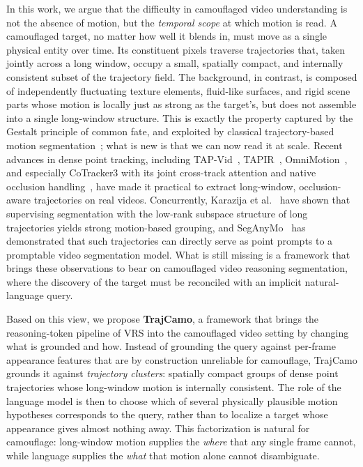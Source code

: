 \documentclass[11pt]{article}
\begin{document}
In this work, we argue that the difficulty in camouflaged video understanding is not the absence of motion, but the \emph{temporal scope} at which motion is read.
A camouflaged target, no matter how well it blends in, must move as a single physical entity over time.
Its constituent pixels traverse trajectories that, taken jointly across a long window, occupy a small, spatially compact, and internally consistent subset of the trajectory field.
The background, in contrast, is composed of independently fluctuating texture elements, fluid-like surfaces, and rigid scene parts whose motion is locally just as strong as the target's, but does not assemble into a single long-window structure.
This is exactly the property captured by the Gestalt principle of common fate, and exploited by classical trajectory-based motion segmentation~\cite{broxmalik,ochs2014}; what is new is that we can now read it at scale.
Recent advances in dense point tracking, including TAP-Vid~\cite{tapvid}, TAPIR~\cite{tapir}, OmniMotion~\cite{omnimotion}, and especially CoTracker3 with its joint cross-track attention and native occlusion handling~\cite{cotracker3}, have made it practical to extract long-window, occlusion-aware trajectories on real videos.
Concurrently, Karazija et al.~\cite{karazija} have shown that supervising segmentation with the low-rank subspace structure of long trajectories yields strong motion-based grouping, and SegAnyMo~\cite{seganymo} has demonstrated that such trajectories can directly serve as point prompts to a promptable video segmentation model.
What is still missing is a framework that brings these observations to bear on camouflaged video reasoning segmentation, where the discovery of the target must be reconciled with an implicit natural-language query.

Based on this view, we propose \textbf{TrajCamo}, a framework that brings the reasoning-token pipeline of VRS into the camouflaged video setting by changing what is grounded and how.
Instead of grounding the query against per-frame appearance features that are by construction unreliable for camouflage, TrajCamo grounds it against \emph{trajectory clusters}: spatially compact groups of dense point trajectories whose long-window motion is internally consistent.
The role of the language model is then to choose which of several physically plausible motion hypotheses corresponds to the query, rather than to localize a target whose appearance gives almost nothing away.
This factorization is natural for camouflage: long-window motion supplies the \emph{where} that any single frame cannot, while language supplies the \emph{what} that motion alone cannot disambiguate.
\end{document}
